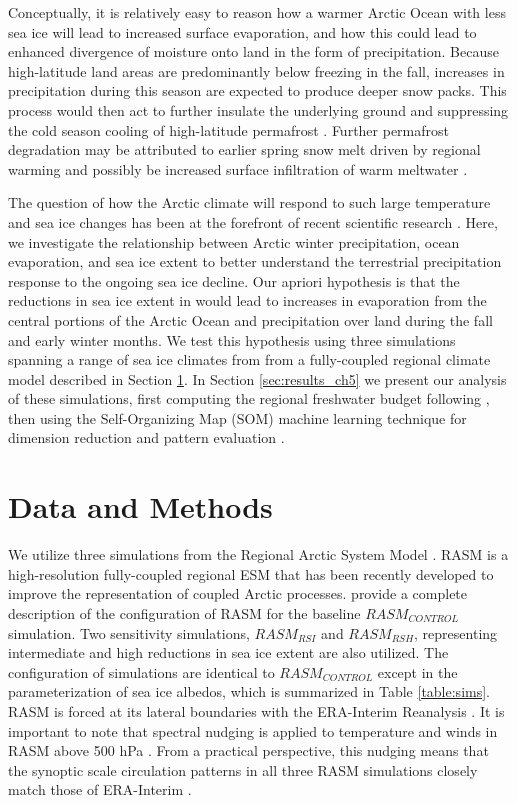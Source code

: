 Conceptually, it is relatively easy to reason how a warmer Arctic Ocean with less sea ice will lead to increased surface evaporation, and how this could lead to enhanced divergence of moisture onto land in the form of precipitation.
Because high-latitude land areas are predominantly below freezing in the fall, increases in precipitation during this season are expected to produce deeper snow packs.
This process would then act to further insulate the underlying ground and suppressing the cold season cooling of high-latitude permafrost \citep{Osterkamp_1999,Zhang_2005,Lawrence_2010}.
Further permafrost degradation may be attributed to earlier spring snow melt driven by regional warming and possibly be increased surface infiltration of warm meltwater \citep{Lawrence_2010}.

The question of how the Arctic climate will respond to such large temperature and sea ice changes has been at the forefront of recent scientific research \citep[e.g. ][]{Kazutoshi_2014,Simmonds_2014,Wegmann_2015,Vihma_2014}.
Here, we investigate the relationship between Arctic winter precipitation, ocean evaporation, and sea ice extent to better understand the terrestrial precipitation response to the ongoing sea ice decline.
Our apriori hypothesis is that the reductions in sea ice extent in would lead to increases in evaporation from the central portions of the Arctic Ocean and precipitation over land during the fall and early winter months.
We test this hypothesis using three simulations spanning a range of sea ice climates from from a fully-coupled regional climate model described in Section \ref{sec:data_models_ch5}.
In Section \ref{sec:results_ch5} we present our analysis of these simulations, first computing the regional freshwater budget following \citet{Serreze_2006a}, then using the Self-Organizing Map (SOM) machine learning technique for dimension reduction and pattern evaluation \citep{Kohonen_1998,Hewitson_2002}.

\section{Data and Methods}
\label{sec:data_models_ch5}

We utilize three simulations from the Regional Arctic System Model \citep[RASM; ][]{Hamman_2016a,Roberts_2015a}.
RASM is a high-resolution fully-coupled regional ESM that has been recently developed to improve the representation of coupled Arctic processes.
\citet{Hamman_2016b} provide a complete description of the configuration of RASM for the baseline $RASM_{CONTROL}$ simulation.
Two sensitivity simulations, $RASM_{RSI}$ and $RASM_{RSH}$, representing intermediate and high reductions in sea ice extent are also utilized.
The configuration of simulations are identical to $RASM_{CONTROL}$ except in the parameterization of sea ice albedos, which is summarized in Table \ref{table:sims}.
RASM is forced at its lateral boundaries with the ERA-Interim Reanalysis \citep{Dee_2011}.
It is important to note that spectral nudging is applied to temperature and winds in RASM above 500 hPa \citep{Cassano_2016}.
From a practical perspective, this nudging means that the synoptic scale circulation patterns in all three RASM simulations closely match those of ERA-Interim \citep{Glisan_2013}.

